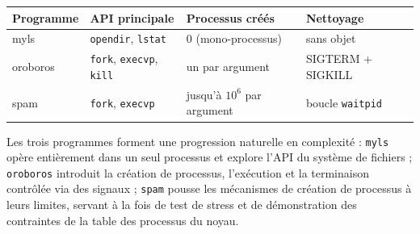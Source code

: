 \documentclass[12pt,a4paper]{article}
\begin{document}
\begin{center}
\begin{tabular}{@{}llll@{}}
\toprule
Programme  & API principale                         & Processus créés          & Nettoyage \\
\midrule
myls       & \texttt{opendir}, \texttt{lstat}       & 0 (mono-processus)       & sans objet \\
oroboros   & \texttt{fork}, \texttt{execvp}, \texttt{kill} & un par argument    & SIGTERM + SIGKILL \\
spam       & \texttt{fork}, \texttt{execvp}         & jusqu'à $10^6$ par argument & boucle \texttt{waitpid} \\
\bottomrule
\end{tabular}
\end{center}

Les trois programmes forment une progression naturelle en complexité :
\texttt{myls} opère entièrement dans un seul processus et explore l'API du
système de fichiers ; \texttt{oroboros} introduit la création de processus,
l'exécution et la terminaison contrôlée via des signaux ; \texttt{spam} pousse
les mécanismes de création de processus à leurs limites, servant à la fois de
test de stress et de démonstration des contraintes de la table des processus
du noyau.
\end{document}
